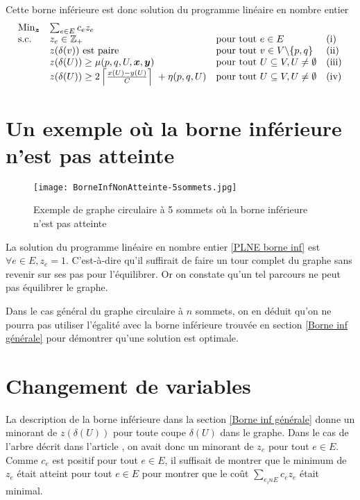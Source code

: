 Cette borne inférieure est donc solution du programme linéaire en nombre entier
\begin{gather}\label{PLNE borne inf}
\begin{array}{llll}
  \mbox{Min}_{\boldsymbol{z}} &\sum_{e \in E} c_ez_e & & \\
  \mbox{s.c.}       &z_e \in \mathbb{Z}_+ &\mbox{pour tout } e \in E &\mbox{(i)} \\
                    &z(\delta(v)) \mbox{ est paire} &\mbox{pour tout } v \in V \backslash \{p,q\}&\mbox{(ii)} \\
                    &z(\delta(U)) \ge \mu(p,q,U,\boldsymbol{x},\boldsymbol{y}) &\mbox{pour tout } U \subseteq V, U \ne \emptyset &\mbox{(iii)} \\
                    &z(\delta(U)) \ge 2 \left\lceil \frac{x(U)-y(U)}{C} \right\rceil\ + \eta(p,q,U) &\mbox{pour tout } U \subseteq V, U \ne \emptyset &\mbox{(iv)}
\end{array}
\end{gather}

\section{Un exemple où la borne inférieure n'est pas atteinte}

\begin{figure}[ht]
  \label{Exemple de borne inf non atteinte}
  \center \texttt{[image: BorneInfNonAtteinte-5sommets.jpg]}
  \caption{Exemple de graphe circulaire à 5 sommets où la borne inférieure n'est pas atteinte}
\end{figure}

La solution du programme linéaire en nombre entier \ref{PLNE borne inf} est $\forall e \in E, z_e = 1$. C'est-à-dire qu'il suffirait de faire un tour complet du graphe sans revenir sur ses pas pour l'équilibrer. Or on constate qu'un tel parcours ne peut pas équilibrer le graphe.

Dans le cas général du graphe circulaire à $n$ sommets, on en déduit qu'on ne pourra pas utiliser l'égalité avec la borne inférieure trouvée en section \ref{Borne inf générale} pour démontrer qu'une solution est optimale.

\section{Changement de variables}
\label{Changement variables}

La description de la borne inférieure dans la section \ref{Borne inf générale} donne un minorant de $z(\delta(U))$ pour toute coupe $\delta(U)$ dans le graphe. Dans le cas de l'arbre décrit dans l'article \cite{Benchimol2011}, on avait donc un minorant de $z_e$ pour tout $e \in E$. Comme $c_e$ est positif pour tout $e\in E$, il suffisait de montrer que le minimum de $z_e$ était atteint pour tout $e \in E$ pour montrer que le coût $\sum_{e _in E}c_ez_e$ était minimal.

